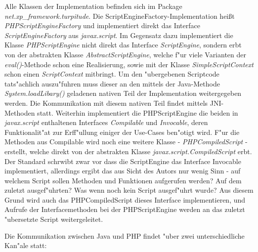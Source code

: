 Alle Klassen der Implementation befinden sich im Package \emph{net.xp\_framework.turpitude}. 
Die ScriptEngineFactory-Implementation hei\ss t \emph{PHPScriptEngineFactory} und implementiert direkt das Interface 
\emph{ScriptEngineFactory} aus \emph{javax.script}. Im Gegensatz dazu implementiert die Klasse \emph{PHPScriptEngine} nicht
direkt das Interface \emph{ScriptEngine}, sondern erbt von der abstrakten Klasse \emph{AbstractScriptEngine}, welche f"ur
viele Varianten der \emph{eval()}-Methode schon eine Realisierung, sowie mit der Klasse \emph{SimpleScriptContext} schon einen 
\emph{ScriptContext} mitbringt. Um den "ubergebenen Scriptcode tats"achlich auszu"fuhren muss dieser an den mittels der Java-Methode
\emph{System.loadLibary()} geladenen nativen Teil der Implementation weitergegeben werden. Die Kommunikation mit diesem
nativen Teil findet mittels JNI-Methoden statt.
Weiterhin implementiert die PHPScriptEngine die beiden in \emph{javax.script} enthaltenen Interfaces \emph{Compilable} und
\emph{Invocable}, deren Funktionalit"at zur Erff"ullung einiger der Use-Cases ben"otigt wird. F"ur die Methoden aus
Compilable wird noch eine weitere Klasse - \emph{PHPCompiledScript} - erstellt, welche direkt von der abstrakten
Klasse \emph{javax.script.CompiledScript} erbt.
Der Standard schrwibt zwar vor dass die ScriptEngine das Interface Invocable implementiert, allerdings ergibt das aus Sicht
des Autors nur wenig Sinn - auf welchem Script sollen Methoden und Funktionen aufgerufen werden? Auf dem zuletzt ausgef"uhrten?
Was wenn noch kein Script ausgef"uhrt wurde? Aus diesem Grund wird auch das PHPCompiledScript dieses Interface implementieren,
und Aufrufe der Interfacemethoden bei der PHPScriptEngine werden an das zuletzt "ubersetzte Script weitergeleitet.

Die Kommunikation zwischen Java und PHP findet "uber zwei unterschiedliche Kan"ale statt:

